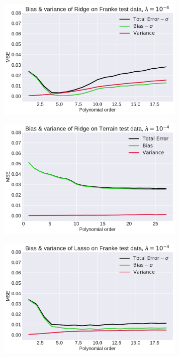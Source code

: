 \documentclass[10pt, twocolumn]{article}
\begin{document}
\begin{appendices}
\begin{figure}[h!]
    \begin{subfigure}[t]{0.45\textwidth}
    \centering
    \includegraphics[scale=0.4]{../figs/BV_bootstrap_Franke_Ridge.pdf}
    \caption{}
    \label{fig:boostrap_franke_ridge}
    \end{subfigure}
    \begin{subfigure}[t]{0.45\textwidth}
    \centering
    \includegraphics[scale=0.4]{../figs/BV_bootstrap_Terrain_Ridge.pdf}
    \caption{}
    \label{fig:boostrap_terrain_ridge}
    \end{subfigure}
    \centering
    \begin{subfigure}[t]{0.45\textwidth}
    \centering
    \includegraphics[scale=0.4]{../figs/BV_bootstrap_Franke_Lasso.pdf}

\end{subfigure}
\end{figure}
\end{appendices}
\end{document}
